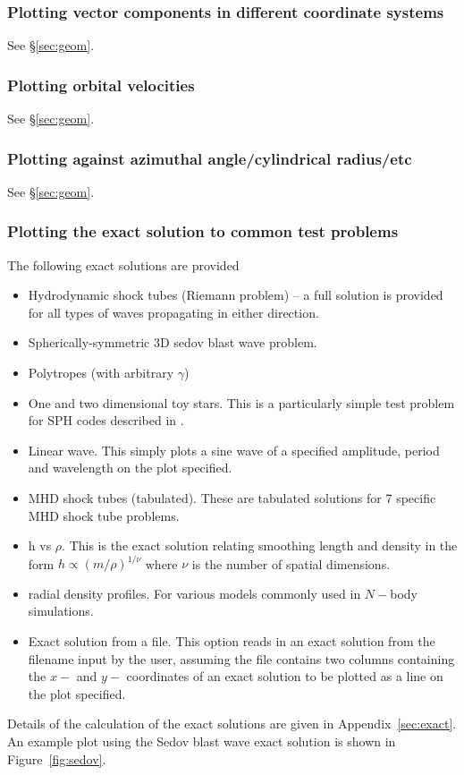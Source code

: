 \documentclass[a4paper,10pt]{article}
\begin{document}
\subsubsection{ Plotting vector components in different coordinate systems}
See \S\ref{sec:geom}.

\subsubsection{ Plotting orbital velocities}
See \S\ref{sec:geom}.

\subsubsection{ Plotting against azimuthal angle/cylindrical radius/etc}
See \S\ref{sec:geom}.

\subsubsection{ Plotting the exact solution to common test problems}
\label{sec:exactsolns}
 The following exact solutions are provided
\begin{itemize}
\item Hydrodynamic shock tubes (Riemann problem) -- a full solution is provided for all types of waves propagating in either direction.
\item Spherically-symmetric 3D sedov blast wave problem.
\item Polytropes (with arbitrary $\gamma$)
\item One and two dimensional toy stars. This is a particularly simple test
problem for SPH codes described in \citet{mp04}.
\item Linear wave. This simply plots a sine wave of a specified amplitude, period and
wavelength on the plot specified.
\item MHD shock tubes (tabulated). These are tabulated solutions for 7 specific MHD
shock tube problems.
\item h vs $\rho$. This is the exact solution relating smoothing length and density in
the form $h \propto (m/\rho)^{1/\nu}$ where $\nu$ is the number of spatial dimensions.
\item radial density profiles. For various models commonly used in $N-$body simulations.
\item Exact solution from a file. This option reads in an exact solution from the
filename input by the user, assuming the file contains two columns containing the $x-$ and $y-$ coordinates of
an exact solution to be plotted as a line on the plot specified.
\end{itemize}
Details of the calculation of the exact solutions are given in Appendix~\ref{sec:exact}. An example plot using the Sedov blast wave exact solution is shown in Figure~\ref{fig:sedov}.
\end{document}
